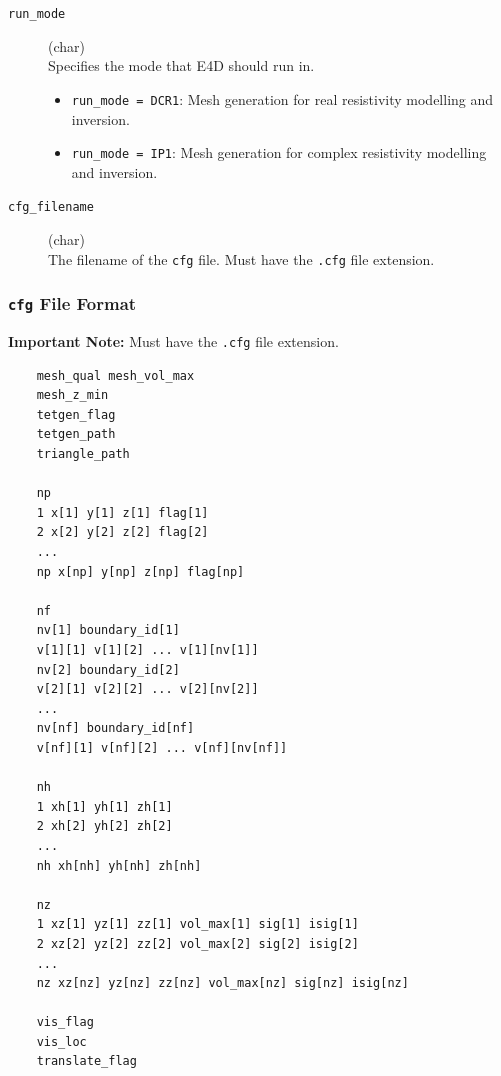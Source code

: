 \documentclass[a4paper,12pt]{article}
\begin{document}
\begin{description}
    \item[\texttt{run\_mode}] (char)\hfill \\
    Specifies the mode that E4D should run in.
    \begin{itemize}
        \item \texttt{run\_mode = DCR1}: Mesh generation for real resistivity modelling and inversion.
        \item \texttt{run\_mode = IP1}: Mesh generation for complex resistivity modelling and inversion.
    \end{itemize}
    
    \item[\texttt{cfg\_filename}] (char)\hfill \\
    The filename of the \texttt{cfg} file. Must have the \texttt{.cfg} file extension.
\end{description}



\subsubsection{\texttt{cfg} File Format} \label{mesh_cfg}

\begin{framed}
\noindent \textbf{Important Note:} Must have the \texttt{.cfg} file extension.
\end{framed}

\begin{framed}
\begingroup
\small
\begin{verbatim}
    mesh_qual mesh_vol_max
    mesh_z_min
    tetgen_flag
    tetgen_path
    triangle_path
    
    np
    1 x[1] y[1] z[1] flag[1]
    2 x[2] y[2] z[2] flag[2]
    ...
    np x[np] y[np] z[np] flag[np]
    
    nf
    nv[1] boundary_id[1]
    v[1][1] v[1][2] ... v[1][nv[1]]
    nv[2] boundary_id[2]
    v[2][1] v[2][2] ... v[2][nv[2]]
    ...
    nv[nf] boundary_id[nf]
    v[nf][1] v[nf][2] ... v[nf][nv[nf]]
    
    nh
    1 xh[1] yh[1] zh[1]
    2 xh[2] yh[2] zh[2]
    ...
    nh xh[nh] yh[nh] zh[nh]
    
    nz
    1 xz[1] yz[1] zz[1] vol_max[1] sig[1] isig[1]
    2 xz[2] yz[2] zz[2] vol_max[2] sig[2] isig[2]
    ...
    nz xz[nz] yz[nz] zz[nz] vol_max[nz] sig[nz] isig[nz]
    
    vis_flag
    vis_loc
    translate_flag
\end{verbatim}
\endgroup
\end{framed}
\end{document}
